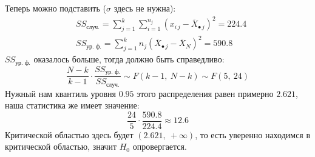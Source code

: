 \documentclass[12pt, a4paper]{article}
\newcommand{\oo}{\infty}
\begin{document}
Теперь можно подставить ($\sigma$ здесь не нужна):
\begin{equation*}
    \begin{aligned}
        & SS_{\text{случ.}} = \sum_{j = 1}^{k} \sum_{i = 1}^{n_j} {\left( x_{i\, j} - \overline{X}_{\bullet\, j} \right)}^2 = 224.4\\
        & SS_{\text{ур. ф.}} = \sum_{j = 1}^k n_j {\left( \overline{X}_{\bullet\, j} - \overline{X}_N \right)}^2 = 590.8
    \end{aligned}
\end{equation*}
$SS_{\text{ур. ф.}}$ оказалось больше, тогда должно быть справедливо:
\[\frac{N - k}{k - 1} \cdot \frac{SS_{\text{ур. ф.}}}{SS_{\text{случ.}}} \sim F(k - 1,\ N - k) \sim F(5,\ 24)\]
Нужный нам квантиль уровня $0.95$ этого распределения равен примерно $2.621$, наша статистика же имеет значение:
\[\frac{24}{5}\cdot \frac{590.8}{224.4} \approx 12.6\]
Критической областью здесь будет $(2.621,\ +\oo)$, то есть уверенно находимся в критической областью, значит $H_0$ опровергается.
\end{document}

